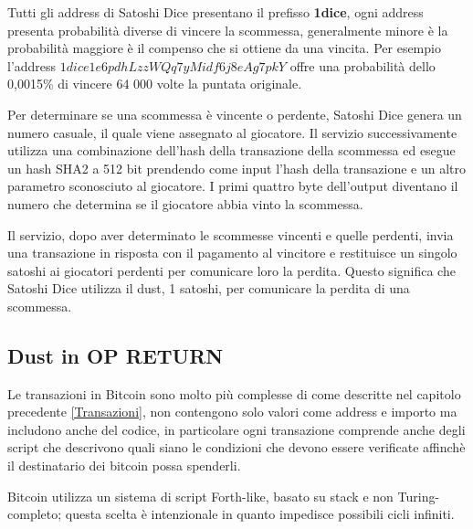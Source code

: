Tutti gli address di Satoshi Dice presentano il prefisso \textbf{1dice}, ogni address presenta probabilità diverse di vincere la scommessa, generalmente minore è la probabilità maggiore è il compenso che si ottiene da una vincita. Per esempio l'address $1dice1e6pdhLzzWQq7yMidf6j8eAg7pkY$ offre una probabilità dello 0,0015\% di vincere 64 000 volte la puntata originale.

Per determinare se una scommessa è vincente o perdente, Satoshi Dice genera un numero casuale, il quale viene assegnato al giocatore. Il servizio successivamente utilizza una combinazione dell'hash della transazione della scommessa ed esegue un hash SHA2 a 512 bit prendendo come input l'hash della transazione e un altro parametro sconosciuto al giocatore. I primi quattro byte dell'output diventano il numero che determina se il giocatore abbia vinto la scommessa.

Il servizio, dopo aver determinato le scommesse vincenti e quelle perdenti, invia una transazione in risposta con il pagamento al vincitore e restituisce un singolo satoshi ai giocatori perdenti per comunicare loro la perdita. Questo significa che Satoshi Dice utilizza il dust, 1 satoshi, per comunicare la perdita di una scommessa.
\subsection{Dust in OP RETURN}
Le transazioni in Bitcoin sono molto più complesse \cite{script} di come descritte nel capitolo precedente \ref{Transazioni}, non contengono solo valori come address e importo ma includono anche del codice, in particolare ogni transazione comprende anche degli script che descrivono quali siano le condizioni che devono essere verificate affinchè il destinatario dei bitcoin possa spenderli. 

Bitcoin utilizza un sistema di script Forth-like, basato su stack e non Turing-completo; questa scelta è intenzionale in quanto impedisce possibili cicli infiniti. 

